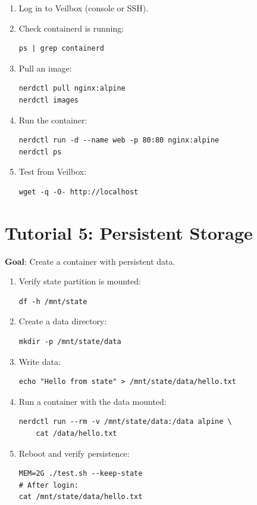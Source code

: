 \begin{enumerate}[nosep]
  \item Log in to Veilbox (console or SSH).
  \item Check containerd is running:
\begin{lstlisting}
ps | grep containerd
\end{lstlisting}
  \item Pull an image:
\begin{lstlisting}
nerdctl pull nginx:alpine
nerdctl images
\end{lstlisting}
  \item Run the container:
\begin{lstlisting}
nerdctl run -d --name web -p 80:80 nginx:alpine
nerdctl ps
\end{lstlisting}
  \item Test from Veilbox:
\begin{lstlisting}
wget -q -O- http://localhost
\end{lstlisting}
\end{enumerate}

\section{Tutorial 5: Persistent Storage}

\textbf{Goal}: Create a container with persistent data.

\begin{enumerate}[nosep]
  \item Verify state partition is mounted:
\begin{lstlisting}
df -h /mnt/state
\end{lstlisting}
  \item Create a data directory:
\begin{lstlisting}
mkdir -p /mnt/state/data
\end{lstlisting}
  \item Write data:
\begin{lstlisting}
echo "Hello from state" > /mnt/state/data/hello.txt
\end{lstlisting}
  \item Run a container with the data mounted:
\begin{lstlisting}
nerdctl run --rm -v /mnt/state/data:/data alpine \
    cat /data/hello.txt
\end{lstlisting}
  \item Reboot and verify persistence:
\begin{lstlisting}
MEM=2G ./test.sh --keep-state
# After login:
cat /mnt/state/data/hello.txt
\end{lstlisting}
\end{enumerate}


